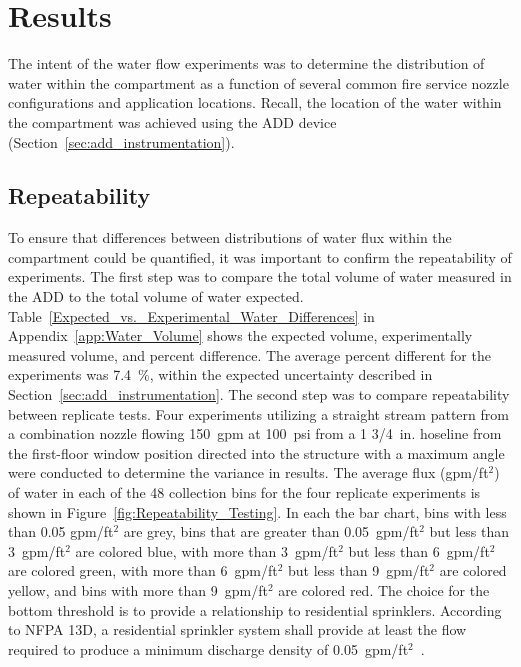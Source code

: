 \documentclass[12pt,oneside]{book}
\begin{document}
\chapter{Results}

The intent of the water flow experiments was to determine the distribution of water within the compartment as a function of several common fire service nozzle configurations and application locations. Recall, the location of the water within the compartment was achieved using the ADD device (Section~\ref{sec:add_instrumentation}). 

\section{Repeatability}
\label{sec:repeat}
To ensure that differences between distributions of water flux within the compartment could be quantified, it was important to confirm the repeatability of experiments. The first step was to compare the total volume of water measured in the ADD to the total volume of water expected. Table~\ref{Expected_vs._Experimental_Water_Differences} in Appendix~\ref{app:Water_Volume} shows the expected volume, experimentally measured volume, and percent difference. The average percent different for the experiments was 7.4~\%, within the expected uncertainty described in Section~\ref{sec:add_instrumentation}. The second step was to compare repeatability between replicate tests. Four experiments utilizing a straight stream pattern from a combination nozzle flowing 150~gpm at 100~psi from a 1 3/4~in. hoseline from the first-floor window position directed into the structure with a maximum angle were conducted to determine the variance in results. The average flux (gpm/ft$^2$) of water in each of the 48 collection bins for the four replicate experiments is shown in Figure~\ref{fig:Repeatability_Testing}. In each the bar chart, bins with less than 0.05 gpm/ft$^2$ are grey, bins that are greater than 0.05~gpm/ft$^2$ but less than 3~gpm/ft$^2$ are colored blue, with more than 3~gpm/ft$^2$ but less than 6~gpm/ft$^2$ are colored green, with more than 6~gpm/ft$^2$ but less than 9~gpm/ft$^2$ are colored yellow, and bins with more than 9~gpm/ft$^2$ are colored red. The choice for the bottom threshold is to provide a relationship to residential sprinklers. According to NFPA 13D, a residential sprinkler system shall provide at least the flow required to produce a minimum discharge density of 0.05~gpm/ft$^2$~\cite{NFPA_13D}.
\end{document}
